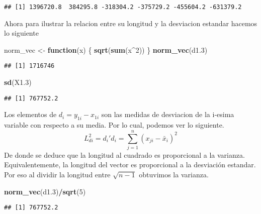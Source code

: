 \documentclass[]{article}
\newenvironment{Shaded}{\begin{snugshade}}{\end{snugshade}}
\newcommand{\ControlFlowTok}[1]{\textcolor[rgb]{0.13,0.29,0.53}{\textbf{#1}}}
\newcommand{\DecValTok}[1]{\textcolor[rgb]{0.00,0.00,0.81}{#1}}
\newcommand{\FloatTok}[1]{\textcolor[rgb]{0.00,0.00,0.81}{#1}}
\newcommand{\KeywordTok}[1]{\textcolor[rgb]{0.13,0.29,0.53}{\textbf{#1}}}
\newcommand{\NormalTok}[1]{#1}
\newcommand{\OperatorTok}[1]{\textcolor[rgb]{0.81,0.36,0.00}{\textbf{#1}}}
\newcommand{\StringTok}[1]{\textcolor[rgb]{0.31,0.60,0.02}{#1}}
\begin{document}
\begin{verbatim}
## [1] 1396720.8  384295.8 -318304.2 -375729.2 -455604.2 -631379.2
\end{verbatim}

Ahora para ilustrar la relacion entre su longitud y la desviacion
estandar hacemos lo siguiente

\begin{Shaded}
\begin{Highlighting}[]
\NormalTok{norm_vec <-}\StringTok{ }\ControlFlowTok{function}\NormalTok{(x)}
\NormalTok{\{}
  \KeywordTok{sqrt}\NormalTok{(}\KeywordTok{sum}\NormalTok{(x}\OperatorTok{^}\DecValTok{2}\NormalTok{))}
\NormalTok{\}}
\KeywordTok{norm_vec}\NormalTok{(d1}\FloatTok{.3}\NormalTok{)}
\end{Highlighting}
\end{Shaded}

\begin{verbatim}
## [1] 1716746
\end{verbatim}

\begin{Shaded}
\begin{Highlighting}[]
\KeywordTok{sd}\NormalTok{(X1}\FloatTok{.3}\NormalTok{)}
\end{Highlighting}
\end{Shaded}

\begin{verbatim}
## [1] 767752.2
\end{verbatim}

Los elementos de \(d_i = y_{1i} - x_{1i}\) son las medidas de desviacion
de la i-esima variable con respecto a su media. Por lo cual, podemos ver
lo siguiente.
\[L_{di}^2 = d_i'd_i = \sum_{j = 1}^n(x_{ji}-\bar{x}_i)^2\] De donde se
deduce que la longitud al cuadrado es proporcional a la varianza.
Equivalentemente, la longitud del vector es proporcional a la desviación
estandar. Por eso al dividir la longitud entre \(\sqrt{n-1}\) obtuvimos
la varianza.

\begin{Shaded}
\begin{Highlighting}[]
\KeywordTok{norm_vec}\NormalTok{(d1}\FloatTok{.3}\NormalTok{)}\OperatorTok{/}\KeywordTok{sqrt}\NormalTok{(}\DecValTok{5}\NormalTok{)}
\end{Highlighting}
\end{Shaded}

\begin{verbatim}
## [1] 767752.2
\end{verbatim}
\end{document}
